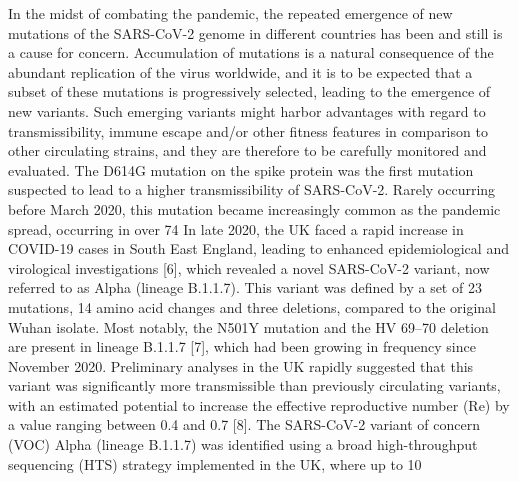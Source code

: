 In the midst of combating the pandemic, the repeated emergence of new mutations of the SARS-CoV-2 genome in different countries has been and still is a cause for concern. Accumulation of mutations is a natural consequence of the abundant replication of the virus worldwide, and it is to be expected that a subset of these mutations is progressively selected, leading to the emergence of new variants. Such emerging variants might harbor advantages with regard to transmissibility, immune escape and/or other fitness features in comparison to other circulating strains, and they are therefore to be carefully monitored and evaluated. The D614G mutation on the spike protein was the first mutation suspected to lead to a higher transmissibility of SARS-CoV-2. Rarely occurring before March 2020, this mutation became increasingly common as the pandemic spread, occurring in over 74%
In late 2020, the UK faced a rapid increase in COVID-19 cases in South East England, leading to enhanced epidemiological and virological investigations [6], which revealed a novel SARS-CoV-2 variant, now referred to as Alpha (lineage B.1.1.7). This variant was defined by a set of 23 mutations, 14 amino acid changes and three deletions, compared to the original Wuhan isolate. Most notably, the N501Y mutation and the HV 69–70 deletion are present in lineage B.1.1.7 [7], which had been growing in frequency since November 2020. Preliminary analyses in the UK rapidly suggested that this variant was significantly more transmissible than previously circulating variants, with an estimated potential to increase the effective reproductive number (Re) by a value ranging between 0.4 and 0.7 [8].
The SARS-CoV-2 variant of concern (VOC) Alpha (lineage B.1.1.7) was identified using a broad high-throughput sequencing (HTS) strategy implemented in the UK, where up to 10%
